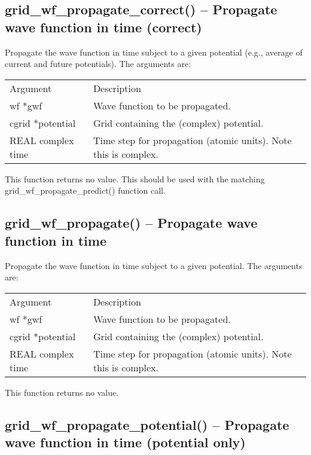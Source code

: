 \documentclass[12pt,letterpaper]{report}
\begin{document}
\subsection{grid\_wf\_propagate\_correct() -- Propagate wave function in time (correct)}

Propagate the wave function in time subject to a given potential (e.g., average of current and future potentials). The arguments are:
\begin{longtable}{p{} p{}}
Argument & Description\\
\cline{1-2}
wf *gwf & Wave function to be propagated.\\
cgrid *potential & Grid containing the (complex) potential.\\
REAL complex time & Time step for propagation (atomic units). Note this is complex.\\
\end{longtable}
\noindent
This function returns no value. This should be used with the matching grid\_wf\_propagate\_predict() function call.

\subsection{grid\_wf\_propagate() -- Propagate wave function in time}

Propagate the wave function in time subject to a given potential. The arguments are:
\begin{longtable}{p{} p{}}
Argument & Description\\
\cline{1-2}
wf *gwf & Wave function to be propagated.\\
cgrid *potential & Grid containing the (complex) potential.\\
REAL complex time & Time step for propagation (atomic units). Note this is complex.\\
\end{longtable}
\noindent
This function returns no value.

\subsection{grid\_wf\_propagate\_potential() -- Propagate wave function in time (potential only)}
\end{document}
